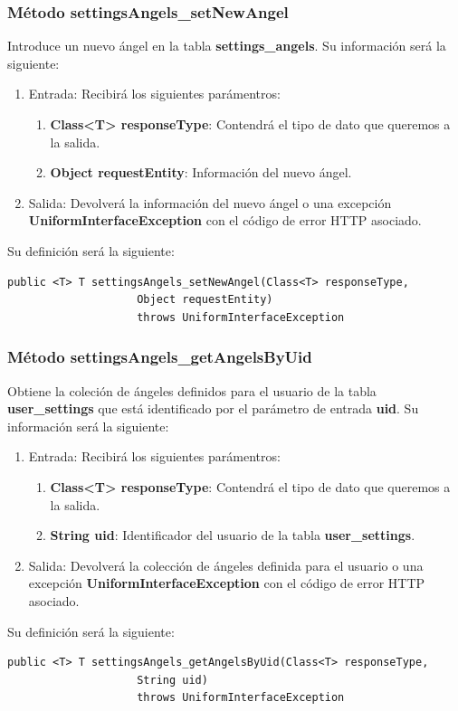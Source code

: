 \subsubsection{Método settingsAngels\_setNewAngel}
Introduce un nuevo ángel en la tabla \textbf{settings\_angels}. Su información será la siguiente:
\begin{enumerate}
\item Entrada: Recibirá los siguientes parámentros:
\begin{enumerate}
\item \textbf{Class<T> responseType}: Contendrá el tipo de dato que queremos a la salida. 
\item \textbf{Object requestEntity}: Información del nuevo ángel.
\end{enumerate}
\item Salida: Devolverá la información del nuevo ángel o una excepción \textbf{UniformInterfaceException} con el código de error HTTP asociado.
\end{enumerate}
\bigskip
\par
Su definición será la siguiente:
\begin{verbatim}public <T> T settingsAngels_setNewAngel(Class<T> responseType, 
					Object requestEntity) 
					throws UniformInterfaceException\end{verbatim}

\subsubsection{Método settingsAngels\_getAngelsByUid}
Obtiene la coleción de ángeles definidos para el usuario de la tabla \textbf{user\_settings} que está identificado por el parámetro de entrada \textbf{uid}. Su información será la siguiente:
\begin{enumerate}
\item Entrada: Recibirá los siguientes parámentros:
\begin{enumerate}
\item \textbf{Class<T> responseType}: Contendrá el tipo de dato que queremos a la salida. 
\item \textbf{String uid}: Identificador del usuario de la tabla \textbf{user\_settings}.
\end{enumerate}
\item Salida: Devolverá la colección de ángeles definida para el usuario o una excepción \textbf{UniformInterfaceException} con el código de error HTTP asociado.
\end{enumerate}
\bigskip
\par
Su definición será la siguiente:
\begin{verbatim}public <T> T settingsAngels_getAngelsByUid(Class<T> responseType, 
					String uid) 
					throws UniformInterfaceException\end{verbatim}

